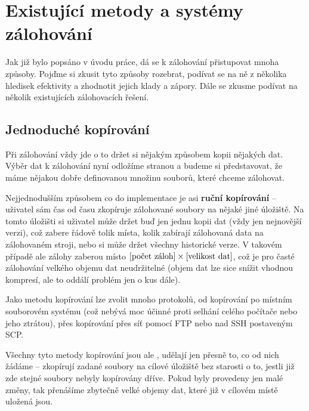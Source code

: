\chapter{Existující metody a systémy zálohování}

Jak již bylo popsáno v úvodu práce, dá se k zálohování přistupovat mnoha způsoby.
Pojďme si zkusit tyto způsoby rozebrat, podívat se na ně z několika hledisek
efektivity a zhodnotit jejich klady a zápory. Dále se zkusme podívat na
několik existujících zálohovacích řešení.

\section{Jednoduché kopírování}

Při zálohování vždy jde o to držet si nějakým způsobem kopii nějakých dat. Výběr
dat k zálohování nyní odložíme stranou a budeme si představovat, že máme nějakou
dobře definovanou množinu souborů, které chceme zálohovat.


Nejjednodušším způsobem co do implementace je asi {\bf ruční kopírování} --
uživatel sám čas od času zkopíruje zálohované soubory na nějaké jiné úložiště.
Na tomto úložišti si uživatel může držet buď jen jednu kopii dat (vždy jen
nejnovější verzi), což zabere řádově tolik místa, kolik zabírají zálohovaná data
na zálohovaném stroji, nebo si může držet všechny historické verze. V takovém
případě ale zálohy zaberou místo $[\hbox{počet záloh}]\times[\hbox{velikost dat}]$,
což je pro časté zálohování velkého objemu dat neudržitelné (objem dat lze sice
snížit vhodnou kompresí, ale to oddálí problém jen o kus dále).

Jako metodu kopírování lze zvolit mnoho protokolů, od kopírování po místním
souborovém systému (což nebývá moc účinné proti selhání celého počítače nebo
jeho ztrátou), přes kopírování přes síť pomocí \gls{FTP} nebo nad \gls{SSH}
postaveným \gls{SCP}.

Všechny tyto metody kopírování jsou ale , udělají jen přesně to, co
od nich žádáme -- zkopírují zadané soubory na cílové úložiště bez starosti o to,
jestli již zde stejné soubory nebyly kopírovány dříve. Pokud byly provedeny jen
malé změny, tak přenášíme zbytečně velké objemy dat, které již v cílovém místě
uložená jsou.


